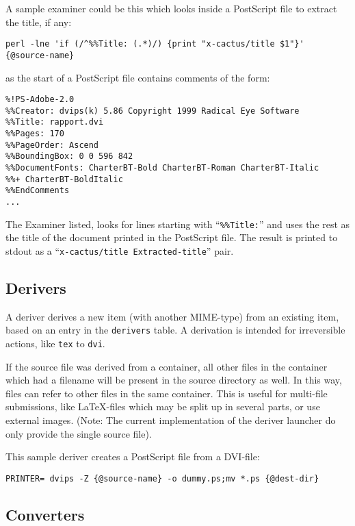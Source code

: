 A sample examiner could be this which looks inside a PostScript file
to extract the title, if any:

\begin{verbatim}
perl -lne 'if (/^%%Title: (.*)/) {print "x-cactus/title $1"}' {@source-name}
\end{verbatim}

as the start of a PostScript file contains comments of the form:

\begin{verbatim}
%!PS-Adobe-2.0
%%Creator: dvips(k) 5.86 Copyright 1999 Radical Eye Software
%%Title: rapport.dvi
%%Pages: 170
%%PageOrder: Ascend
%%BoundingBox: 0 0 596 842
%%DocumentFonts: CharterBT-Bold CharterBT-Roman CharterBT-Italic
%%+ CharterBT-BoldItalic
%%EndComments
...
\end{verbatim}

The Examiner listed, looks for lines starting with
``\texttt{\%\%Title:}'' and uses the rest as the title of the document
printed in the PostScript file.  The result is printed to stdout as a
``\texttt{x-cactus/title Extracted-title}'' pair.  

\subsection{Derivers}

A deriver derives a new item (with another MIME-type) from
an existing item, based on an entry in the \texttt{derivers}
table.  A derivation is intended for irreversible actions, like
\texttt{tex} to \texttt{dvi}.

If the source file was derived from a container, all other files in
the container which had a filename will be present in the source
directory as well.  In this way, files can refer to other files in the
same container.  This is useful for multi-file submissions, like
{\LaTeX}-files which may be split up in several parts, or use external
images.  (Note:  The current implementation of the deriver launcher do
only provide the single source file).

This sample deriver creates a PostScript file from a DVI-file:

\begin{verbatim}
PRINTER= dvips -Z {@source-name} -o dummy.ps;mv *.ps {@dest-dir}
\end{verbatim}



\subsection{Converters}

